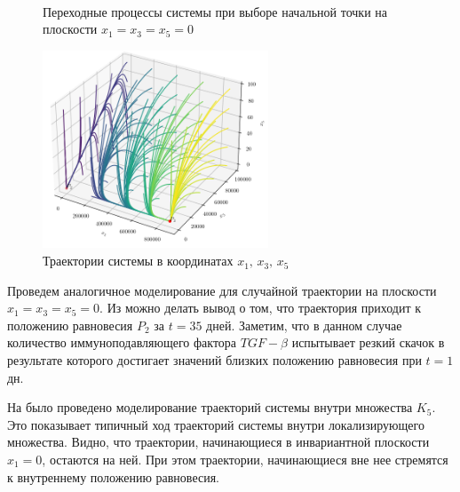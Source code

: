 \documentclass[14pt,a4paper]{extarticle}
\begin{document}
\begin{example}
		\begin{figure}[h]
			\centering
			\\
			\caption{Переходные процессы системы при выборе начальной точки на плоскости $x_1=x_3=x_5=0$}
			\label{fig:on_D_border}
		\end{figure}
		\begin{figure}[h]
			\centering
			\includegraphics[width=0.60\textwidth]{media/Figure_11.png}
			\caption{Траектории системы в координатах $x_1,\, x_3,\, x_5$}
			\label{fig:model_K5}
		\end{figure}
		
		Проведем аналогичное моделирование для случайной траектории на плоскости $x_1=x_3=x_5=0$. Из  можно делать вывод о том, что траектория приходит к положению равновесия $P_2$ за $t=35$ дней. Заметим, что в данном случае количество иммуноподавляющего фактора $TGF-\beta$ испытывает резкий скачок в результате которого достигает значений близких положению равновесия при $t=1$ дн. 	
		
		На  было проведено моделирование траекторий системы внутри множества $K_5$. Это показывает типичный ход траекторий системы внутри локализирующего множества. Видно, что траектории, начинающиеся в инвариантной плоскости $x_1=0$, остаются на ней. При этом траектории, начинающиеся вне нее стремятся к внутреннему положению равновесия.
	\end{example}
	
\end{document}
